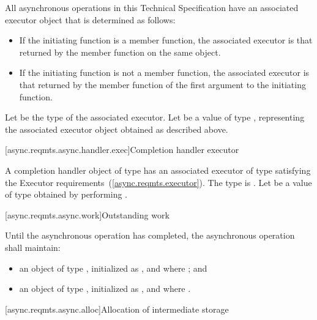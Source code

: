 \pnum
 All asynchronous operations in this Technical Specification have an associated executor object that is determined as follows:

\begin{itemize}
\item
If the initiating function is a member function, the associated executor is that returned by the  member function on the same object.

\item
If the initiating function is not a member function, the associated executor is that returned by the  member function of the first argument to the initiating function.
\end{itemize}

\pnum
Let  be the type of the associated executor. Let  be a value of type , representing the associated executor object obtained as described above.



[async.reqmts.async.handler.exec]{Completion handler executor}

\pnum
A completion handler object of type  has an associated executor of type  satisfying the Executor requirements~(\ref{async.reqmts.executor}). The type  is . Let  be a value of type  obtained by performing .



[async.reqmts.async.work]{Outstanding work}

\pnum
 Until the asynchronous operation has completed, the asynchronous operation shall maintain:

\begin{itemize}
\item
an object  of type , initialized as , and where ; and

\item
an object  of type , initialized as , and where .
\end{itemize}



[async.reqmts.async.alloc]{Allocation of intermediate storage}


